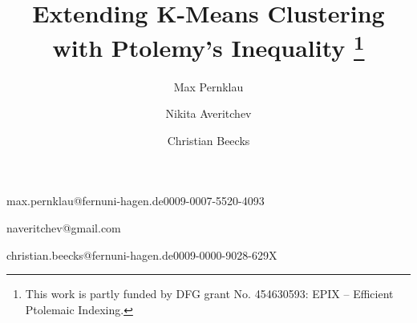 







\title[Extending K-Means Clustering with Ptolemy’s Inequality]{Extending K-Means Clustering with Ptolemy’s Inequality
\thanks{This work is partly funded by DFG grant No. 454630593: EPIX – Efficient Ptolemaic Indexing.} 
}
\author[1]{Max Pernklau}{max.pernklau@fernuni-hagen.de}{0009-0007-5520-4093}
\author[1]{Nikita Averitchev}{naveritchev@gmail.com}{}
\author[1]{Christian Beecks}{christian.beecks@fernuni-hagen.de}{0009-0000-9028-629X}



